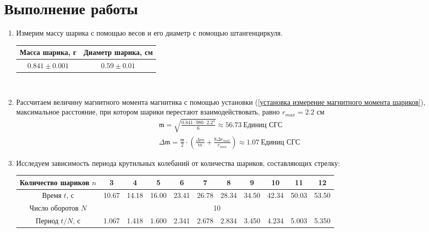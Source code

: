 \documentclass[a4paper, 12pt]{article}
\begin{document}
\section*{Выполнение работы}
\begin{enumerate}
    \item Измерим массу шарика с помощью весов и его диаметр с помощью штангенциркуля.
    \begin{table}[h]
        \centering
        \begin{tabular}{|c|c|}
            \hline
            Масса шарика, г & Диаметр шарика, см\\ \hline
            $0.841\pm 0.001$ & $0.59\pm 0.01$\\ \hline
        \end{tabular}
    \end{table}\\
    \item Рассчитаем величину магнитного момента магнитика с помощью установки (\ref{установка измерение магнитного момента шариков}), максимальное
    расстояние, при котором шарики перестают взаимодействовать, равно $r_{max} = 2.2$ см
    \begin{equation*}
        \begin{aligned}
            \mathfrak{m} = \sqrt{\frac{0.841\cdot 980\cdot 2.2^{4}}{6}} \approx 56.73\ \text{Единиц СГС}\\
            \Delta \mathfrak{m} = \frac{\mathfrak{m}}{2}\cdot \left(\frac{\Delta m}{m} + \frac{8\Delta r_{max}}{r_{max}}\right) \approx 1.07\ \text{Единиц СГС}
        \end{aligned}
    \end{equation*}
    \item Исследуем зависимость периода крутильных колебаний от количества шариков, составляющих стрелку:
    \begin{table}[h]
        \centering
        \begin{tabular}{|c|c|c|c|c|c|c|c|c|c|c|}
            \hline
            Количество шариков $n$ & 3 & 4 & 5 & 6 & 7 & 8 & 9 & 10 & 11 & 12\\ \hline
            Время $t$, с & 10.67 & 14.18 & 16.00 & 23.41 & 26.78 & 28.34 & 34.50 & 42.34 & 50.03 & 53.50\\ \hline
            Число оборотов $N$ & \multicolumn{10}{|c|}{10}\\ \hline
            Период $t/N$, с & 1.067 & 1.418 & 1.600 & 2.341 & 2.678 & 2.834 & 3.450 & 4.234 & 5.003 & 5.350\\ \hline

\end{tabular}
\end{table}
\end{enumerate}
\end{document}
